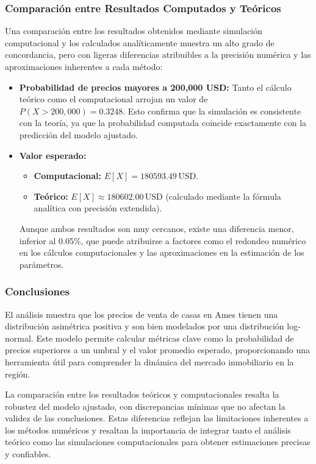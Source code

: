 \documentclass[12pt]{article}
\begin{document}
\subsubsection{Comparación entre Resultados Computados y Teóricos}
Una comparación entre los resultados obtenidos mediante simulación computacional y los calculados analíticamente muestra un alto grado de concordancia, pero con ligeras diferencias atribuibles a la precisión numérica y las aproximaciones inherentes a cada método:

\begin{itemize}
    \item \textbf{Probabilidad de precios mayores a 200,000 USD:} Tanto el cálculo teórico como el computacional arrojan un valor de \( P(X > 200,000) = 0.3248 \). Esto confirma que la simulación es consistente con la teoría, ya que la probabilidad computada coincide exactamente con la predicción del modelo ajustado.
    \item \textbf{Valor esperado:} 
    \begin{itemize}
        \item \textbf{Computacional:} \( E[X] = \num{180593.49} \, \text{USD} \).
        \item \textbf{Teórico:} \( E[X] \approx \num{180602.00} \, \text{USD} \) (calculado mediante la fórmula analítica con precisión extendida).
    \end{itemize}
    Aunque ambos resultados son muy cercanos, existe una diferencia menor, inferior al 0.05\%, que puede atribuirse a factores como el redondeo numérico en los cálculos computacionales y las aproximaciones en la estimación de los parámetros.

\end{itemize}

\subsubsection*{Conclusiones}
El análisis muestra que los precios de venta de casas en Ames tienen una distribución asimétrica positiva y son bien modelados por una distribución log-normal. Este modelo permite calcular métricas clave como la probabilidad de precios superiores a un umbral y el valor promedio esperado, proporcionando una herramienta útil para comprender la dinámica del mercado inmobiliario en la región.

La comparación entre los resultados teóricos y computacionales resalta la robustez del modelo ajustado, con discrepancias mínimas que no afectan la validez de las conclusiones. Estas diferencias reflejan las limitaciones inherentes a los métodos numéricos y resaltan la importancia de integrar tanto el análisis teórico como las simulaciones computacionales para obtener estimaciones precisas y confiables.
\end{document}
